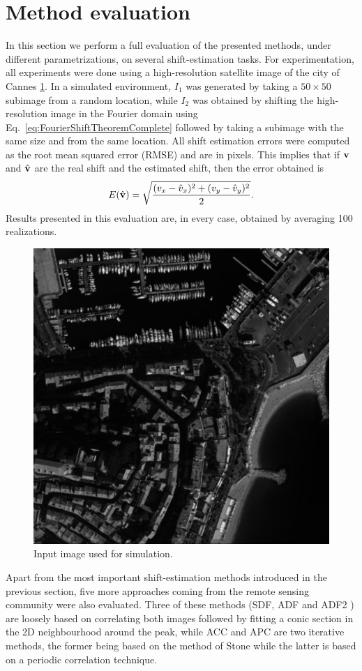 \clearpage
\section{Method evaluation}
\label{sec:methodEvaluationChapter1}
In this section we perform a full evaluation of the presented methods, under different parametrizations, on several shift-estimation tasks. For experimentation, all experiments were done using a high-resolution satellite image of the city of Cannes \ref{fig:CannesChapter1}. In a simulated environment, $I_1$ was generated by taking a $50 \times 50$ subimage from a random location, while $I_2$ was obtained by shifting the high-resolution image in the Fourier domain using Eq.~\eqref{eq:FourierShiftTheoremComplete} followed by taking a subimage with the same size and from the same location. All shift estimation errors were computed as the root mean squared error (RMSE) and are in pixels. This implies that if $\mathbf{v}$ and $\hat{\mathbf{v}}$ are the real shift and the estimated shift, then the error obtained is
\begin{equation}
	E(\hat{\mathbf{v}}) = \sqrt{\frac{(v_x - \hat{v}_x)^2 + (v_y - \hat{v}_y)^2}{2}}.
\end{equation}
Results presented in this evaluation are, in every case, obtained by averaging 100 realizations.

\begin{figure}[htpb]
\centering
\includegraphics[width=.5\textwidth]{img/Cannes}
\caption{Input image used for simulation.}
\label{fig:CannesChapter1}
\end{figure}

Apart from the most important shift-estimation methods introduced in the previous section, five more approaches coming from the remote sensing community were also evaluated. Three of these methods (SDF, ADF and ADF2 \cite{lofdahl2010evaluation}) are loosely based on correlating both images followed by fitting a conic section in the 2D neighbourhood around the peak, while ACC \cite{Sidick2007} and APC \cite{Sidick2011} are two iterative methods, the former being based on the method of Stone \cite{Stone_2001} while the latter is based on a periodic correlation technique.

